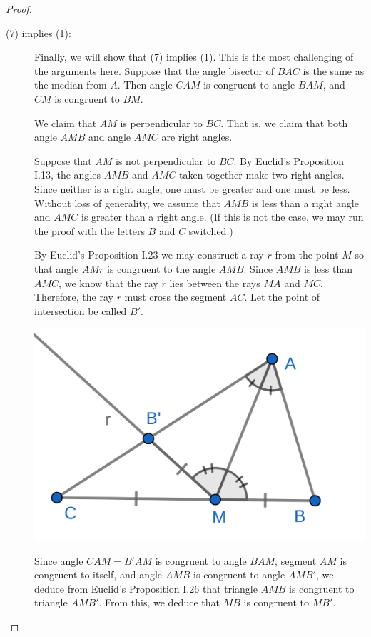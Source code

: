 \documentclass{tufte-handout}
\theoremstyle{definition}
\begin{document}
\begin{proof}
\begin{description}
\clearpage

\item[(7) implies (1):]
Finally, we will show that (7) implies (1). This is the most challenging of the  arguments here. Suppose that the angle bisector of $BAC$ is the same as the median from $A$. Then angle $CAM$ is congruent to angle $BAM$, and $CM$ is congruent to $BM$.

We claim that $AM$ is perpendicular to $BC$. That is, we claim that both angle $AMB$ and angle $AMC$ are right angles.

Suppose that $AM$ is not perpendicular to $BC$. By Euclid's Proposition I.13, the angles $AMB$ and $AMC$ taken together make two right angles. Since neither is a right angle, one must be greater and one must be less. Without loss of generality, we assume that $AMB$ is less than a right angle and $AMC$ is greater than a right angle. (If this is not the case, we may run the proof with the letters $B$ and $C$ switched.)


By Euclid's Proposition I.23 we may construct a ray $r$ from the point $M$ so that angle $AMr$ is congruent to the angle $AMB$. Since $AMB$ is less than $AMC$, we know that the ray $r$ lies between the rays $MA$ and $MC$. Therefore, the ray $r$ must cross the segment $AC$. Let the point of intersection be called $B'$.

\begin{marginfigure}
  \includegraphics{images/iso_4.png}
\end{marginfigure}


Since angle $CAM = B'AM$ is congruent to angle $BAM$, segment $AM$ is congruent to itself, and angle $AMB$ is congruent to angle $AMB'$, we deduce from Euclid's Proposition I.26 that triangle $AMB$ is congruent to triangle $AMB'$. From this, we deduce that $MB$ is congruent to $MB'$.


\end{description}
\end{proof}
\end{document}
